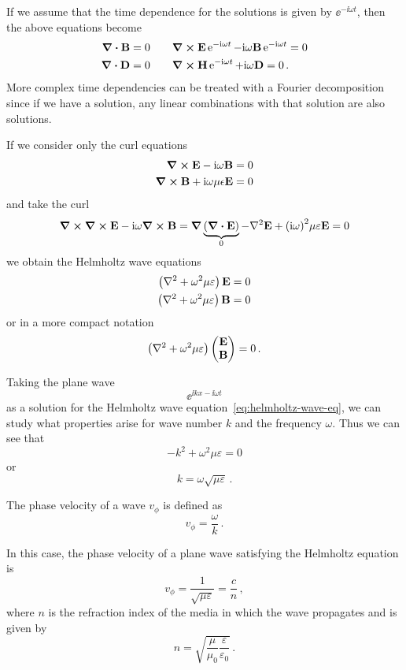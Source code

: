 \documentclass[12pt, class=report, crop=false]{standalone}
\begin{document}
If we assume that the time dependence for the solutions is given by
\(\ee^{-\ii \omega t}\), then the above equations become
\begin{subequations}
  \begin{align*}
    \div{\vb{B}} &= 0  \qquad \curl{\vb{E}}\operatorname{e}^{-\mathrm{i} \omega t} - \mathrm{i} \omega \vb{B} \operatorname{e}^{-\mathrm{i} \omega t} = 0 \\
    \div{\vb{D}} &= 0  \qquad \curl{\vb{H}}\operatorname{e}^{-\mathrm{i} \omega t} + \mathrm{i} \omega \vb{D} = 0\,.
  \end{align*}
\end{subequations}
More complex time dependencies can be treated with a Fourier decomposition since
if we have a solution, any linear combinations with that solution are also solutions.

If we consider only the curl equations
\[
\begin{aligned}
  \curl{\vb{E}} - \mathrm{i} \omega \vb{B} = 0 \\
  \curl{\vb{B}} + \mathrm{i} \omega \mu \epsilon \vb{E} = 0
\end{aligned}
\]
and take the curl
\[
\curl{\curl{\vb{E}}} - \ii \omega \curl{\vb{B}} = \grad{\underbrace{(\div{\vb{E}})}_{0}}
- \laplacian{\vb{E}} + {(\ii \omega)}^2 \mu \varepsilon \vb{E} = 0
\]
we obtain the Helmholtz wave equations
\[
\begin{aligned}
  \left(\laplacian + \omega^2 \mu \varepsilon \right)\vb{E} &= 0 \\
  \left(\laplacian + \omega^2 \mu \varepsilon \right)\vb{B} &= 0
\end{aligned}
\]
or in a more compact notation
\begin{equation*}
\label{eq:helmholtz-wave-eq}
\left(\laplacian + \omega^2 \mu \varepsilon \right)
\begin{pmatrix}
  \vb{E} \\ \vb{B}
\end{pmatrix}
= 0\,.
\end{equation*}

Taking the plane wave
\[
\ee^{\ii k x - \ii \omega t}
\]
as a solution for the Helmholtz wave equation~\eqref{eq:helmholtz-wave-eq}, we can study
what properties arise for wave number \(k\) and the frequency \(\omega\).
Thus we can see that
\[
-k^2 + \omega^2 \mu \varepsilon = 0
\]
or
\[
k = \omega \sqrt{\mu \varepsilon}\,.
\]

The phase velocity of a wave \(v_\phi\) is defined as
\[
v_\phi = \frac{\omega}{k}\,.
\]

In this case, the phase velocity of a plane wave satisfying the
Helmholtz equation is
\[
v_\phi = \frac{1}{\sqrt{\mu\varepsilon}} = \frac{c}{n}\,,
\]
where \(n\) is the refraction index of the media in which the wave propagates and is given by
\[
n = \sqrt{\frac{\mu}{\mu_0}\frac{\varepsilon}{\varepsilon_0}}\,.
\]
\end{document}
